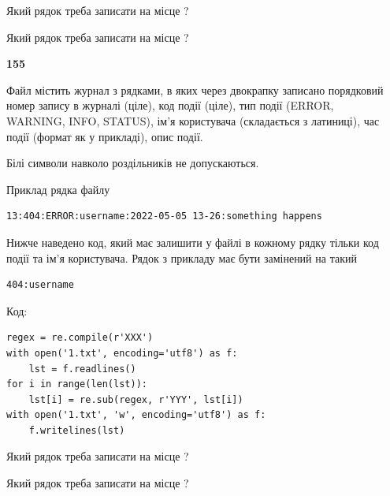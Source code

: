 Який рядок треба записати на місце  ?\par
\vspace{5mm}


Який рядок треба записати на місце  ?\par


\newpage

{\begin {center}\textbf{ 155}\end {center}}\par
Файл  містить журнал з рядками, в яких через двокрапку записано поряд\-ко\-вий номер запису в журналі (ціле), код події (ціле), тип події (ERROR, \\WARNING, INFO, STATUS), ім'я користувача (складається з латиниці), час події (фор\-мат як у прикладі), опис події.

Білі символи навколо роздільників не допускаються.

Приклад рядка файлу



\begin{verbatim}
13:404:ERROR:username:2022-05-05 13-26:something happens
\end{verbatim}


Нижче наведено код, який має залишити у файлі в кожному рядку тільки код події та ім'я користувача. Рядок з прикладу має бути замінений на такий



\begin{verbatim}
404:username
\end{verbatim}




Код:



\begin{verbatim}
regex = re.compile(r'XXX')
with open('1.txt', encoding='utf8') as f:
    lst = f.readlines()
for i in range(len(lst)):
    lst[i] = re.sub(regex, r'YYY', lst[i])
with open('1.txt', 'w', encoding='utf8') as f:
    f.writelines(lst)
\end{verbatim}







Який рядок треба записати на місце  ?\par
\vspace{5mm}


Який рядок треба записати на місце  ?\par


